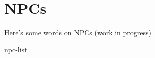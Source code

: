 \chapter{NPCs}
\begin{multicols*}{2}
    Here's some words on NPCs (work in progress)

    {npc-list}
\end{multicols*}
